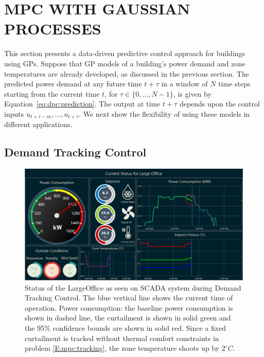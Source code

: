 \section{MPC WITH GAUSSIAN PROCESSES}
\label{S:dpc}

This section presents a data-driven predictive control approach for buildings using GPs.
Suppose that GP models of a building's power demand and zone temperatures are already developed, as discussed in the previous section.
The predicted power demand at any future time $t+\tau$ in a window of $N$ time steps starting from the current time $t$, for \(\tau \in \{0,\dots,N-1\}\), is given by Equation~\eqref{eq:dpc:prediction}.
The output at time \(t+\tau\) depends upon %
the control inputs \(u_{t+\tau-m}, \dots, u_{t+\tau}\).
We next show the flexibility of using these models in different applications.

\subsection{Demand Tracking Control}

\begin{figure}[t]
  \centering
  \includegraphics[width=0.9\linewidth]{images/Dashboard-PowerTrack.png}
  \caption{Status of the LargeOffice as seen on SCADA system during Demand Tracking Control. The blue vertical line shows the current time of operation. Power consumption: the baseline power consumption is shown in dashed line, the curtailment is shown in solid green and the 95\% confidence bounds are shown in solid red. Since a fixed curtailment is tracked without thermal comfort constraints in problem \eqref{E:mpc:tracking}, the zone temperature shoots up by \(2^\circ C\).}
  \label{F:tracking}
\end{figure}

